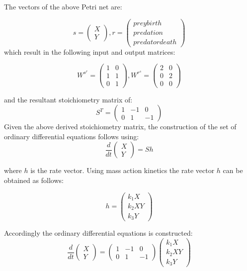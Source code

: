 \documentclass{article}
\begin{document}
The vectors of the above Petri net are: 

\begin{equation}
    s = \begin{pmatrix}X\\Y\end{pmatrix},   r = \begin{pmatrix}prey birth\\predation\\ predator death\end{pmatrix}
\end{equation}
 which result in the following input and output matrices: 
 
 \begin{equation}
    W^s^r = \begin{pmatrix}1 & 0\\1 & 1 \\ 0 & 1 \end{pmatrix},   W^r^s = \begin{pmatrix}2 & 0\\0 & 2\\ 0 & 0\end{pmatrix}
\end{equation}

and the resultant stoichiometry matrix of:
\begin{equation}
    S^T = \begin{pmatrix}1 & -1 & 0\\0 & 1 & -1 \end{pmatrix}
\end{equation}
Given the above derived stoichiometry matrix, the construction of the set of ordinary differential equations follows using: 
\begin{equation}
    \frac{d}{dt} \begin{pmatrix}X\\Y \end{pmatrix} = Sh
\end{equation}

where $h$ is the rate vector. Using mass action kinetics the rate vector $h$ can be obtained as follows: 

\begin{equation}
    h = \begin{pmatrix}k_1X\\k_2XY\\k_3Y \end{pmatrix}
\end{equation}

Accordingly the ordinary differential equations is constructed: 
\begin{equation}
    \frac{d}{dt} \begin{pmatrix}X\\Y \end{pmatrix} = \begin{pmatrix}1 & -1 & 0\\0 & 1 & -1 \end{pmatrix} \begin{pmatrix}k_1X\\k_2XY\\k_3Y \end{pmatrix}
\end{equation}
\end{document}
